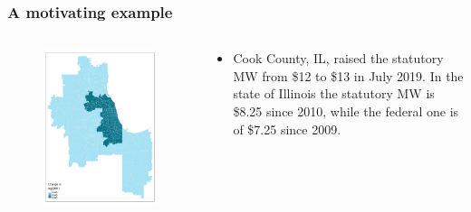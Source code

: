 \documentclass[aspectratio=169, t]{beamer}
\begin{document}
\begin{frame}
\frametitle{A motivating example}
    \begin{columns}
        \begin{column}{0.44\textwidth}
            \vspace{-8mm}
            \begin{figure}
                \centering
                \includegraphics[scale = 0.38]{maps_events/output/chicago_2019-6_actual_mw.png}
            \end{figure}   
        \end{column}
        \begin{column}{0.56\textwidth}
            \begin{itemize}
                \item Cook County, IL, raised the statutory MW from \$12 to \$13 in July 2019. In the state of 
                Illinois the statutory MW is \$8.25 since 2010, while the federal one is of \$7.25 since 2009.

\end{itemize}
\end{column}
\end{columns}
\end{frame}
\end{document}
